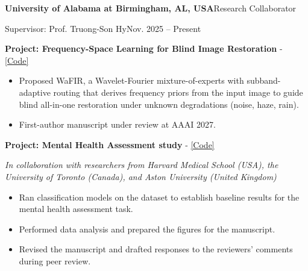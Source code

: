 \documentclass[a4paper,10pt]{extarticle}
\newcommand{\cventry}[2]{\noindent\textbf{#1}\hfill #2\par}
\newcommand{\cvline}[2]{\noindent #1\hfill #2\par}
\newenvironment{cvlist}{\begin{list}{}{%
  \setlength{\leftmargin}{0pt}\setlength{\itemindent}{0pt}%
  \setlength{\parsep}{0pt}\setlength{\itemsep}{4pt}\setlength{\topsep}{4pt}}}%
  {\end{list}}
\begin{document}
\begin{cvlist}
    \item
    \cventry{University of Alabama at Birmingham, AL, USA}{Research Collaborator}
    \cvline{Supervisor: Prof. Truong-Son Hy}{Nov. 2025 -- Present}
    \begin{enumerate}[label={[\arabic*]}, leftmargin=*]
        \item \textbf{Project: Frequency-Space Learning for Blind Image Restoration} - \href{https://anonymous.4open.science/r/WaFIR/README.md}{[Code]}
        \begin{itemize}[leftmargin=*]
            \item Proposed WaFIR, a Wavelet-Fourier mixture-of-experts with subband-adaptive routing that derives frequency priors from the input image to guide blind all-in-one restoration under unknown degradations (noise, haze, rain).
            \item First-author manuscript under review at AAAI 2027.
        \end{itemize}
        \item \textbf{Project: Mental Health Assessment study} - \href{https://github.com/leduckhai/Wearable_LDF-FS}{[Code]}

        \textit{In collaboration with researchers from Harvard Medical School (USA), the University of Toronto (Canada), and Aston University (United Kingdom)}
        \begin{itemize}[leftmargin=*]
            \item Ran classification models on the dataset to establish baseline results for the mental health assessment task.
            \item Performed data analysis and prepared the figures for the manuscript.
            \item Revised the manuscript and drafted responses to the reviewers' comments during peer review.
        \end{itemize}
    \end{enumerate}


\end{cvlist}
\end{document}
